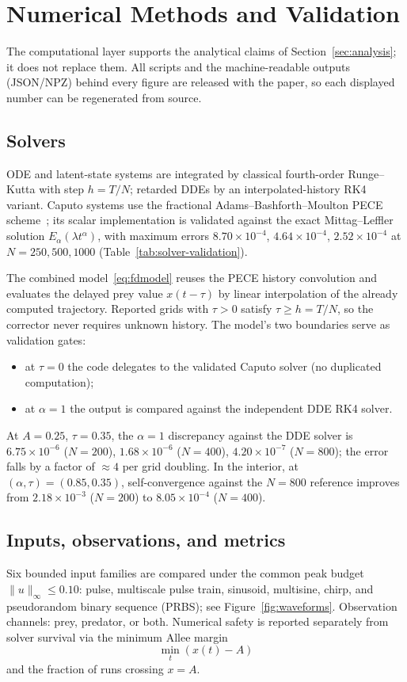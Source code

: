 \section{Numerical Methods and Validation}
\label{sec:numerics}

The computational layer supports the analytical claims of Section~\ref{sec:analysis}; it does not replace them. All scripts and the machine-readable outputs (JSON/NPZ) behind every figure are released with the paper, so each displayed number can be regenerated from source.

\subsection{Solvers}
ODE and latent-state systems are integrated by classical fourth-order Runge--Kutta with step $h=T/N$; retarded DDEs by an interpolated-history RK4 variant. Caputo systems use the fractional Adams--Bashforth--Moulton PECE scheme~\cite{F02}; its scalar implementation is validated against the exact Mittag--Leffler solution $E_\alpha(\lambda t^\alpha)$, with maximum errors $8.70\times10^{-4}$, $4.64\times10^{-4}$, $2.52\times10^{-4}$ at $N=250,500,1000$ (Table~\ref{tab:solver-validation}).

The combined model~\eqref{eq:fdmodel} reuses the PECE history convolution and evaluates the delayed prey value $x(t-\tau)$ by linear interpolation of the already computed trajectory. Reported grids with $\tau>0$ satisfy $\tau\ge h=T/N$, so the corrector never requires unknown history. The model's two boundaries serve as validation gates:
\begin{itemize}
    \item at $\tau=0$ the code delegates to the validated Caputo solver (no duplicated computation);
    \item at $\alpha=1$ the output is compared against the independent DDE RK4 solver.
\end{itemize}
At $A=0.25$, $\tau=0.35$, the $\alpha=1$ discrepancy against the DDE solver is $6.75\times10^{-6}$ ($N=200$), $1.68\times10^{-6}$ ($N=400$), $4.20\times10^{-7}$ ($N=800$); the error falls by a factor of $\approx4$ per grid doubling. In the interior, at $(\alpha,\tau)=(0.85,0.35)$, self-convergence against the $N=800$ reference improves from $2.18\times10^{-3}$ ($N=200$) to $8.05\times10^{-4}$ ($N=400$).

\subsection{Inputs, observations, and metrics}
Six bounded input families are compared under the common peak budget $\|u\|_\infty\le0.10$: pulse, multiscale pulse train, sinusoid, multisine, chirp, and pseudorandom binary sequence (PRBS); see Figure~\ref{fig:waveforms}. Observation channels: prey, predator, or both. Numerical safety is reported separately from solver survival via the minimum Allee margin
\[
\min_t(x(t)-A)
\]
and the fraction of runs crossing $x=A$.


